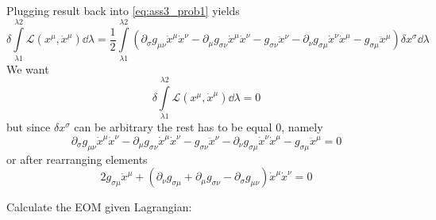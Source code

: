 %
Plugging result back into \autoref{eq:ass3_prob1} yields
%
\begin{equation}
    \delta\int\limits_{\lambda1}^{\lambda2}\mathcal{L}(x^\mu,\dot{x}^\mu)\dd\lambda =
    \frac{1}{2}\int\limits_{\lambda1}^{\lambda2}
    \left(\partial_\sigma g_{\mu\nu}\dot{x}^\mu\dot{x}^\nu -
    \partial_{\mu}g_{\sigma\nu}\dot{x}^\mu\dot{x}^\nu - g_{\sigma\nu}\ddot{x}^\nu -
    \partial_{\nu}g_{\sigma\mu}\dot{x}^\nu\dot{x}^\mu - g_{\sigma\mu}\ddot{x}^\mu\right)\delta x^\sigma \dd\lambda
\end{equation}
%
We want
%
\begin{equation}
   \delta\int\limits_{\lambda1}^{\lambda2}\mathcal{L}(x^\mu,\dot{x}^\mu)\dd\lambda = 0
\end{equation}
%
but since $\delta x^\sigma$ can be arbitrary the rest has to be equal $0$, namely
%
\begin{equation}
    \partial_\sigma g_{\mu\nu}\dot{x}^\mu\dot{x}^\nu -
    \partial_{\mu}g_{\sigma\nu}\dot{x}^\mu\dot{x}^\nu - g_{\sigma\nu}\ddot{x}^\nu -
    \partial_{\nu}g_{\sigma\mu}\dot{x}^\nu\dot{x}^\mu - g_{\sigma\mu}\ddot{x}^\mu = 0
\end{equation}
%
or after rearranging elements
%
\begin{equation}
    \boxed{2 g_{\sigma\mu}\ddot{x}^\mu + \left(\partial_{\nu}g_{\sigma\mu} +
        \partial_{\mu}g_{\sigma\nu} - \partial_\sigma g_{\mu\nu}\right)\dot{x}^\mu\dot{x}^\nu = 0}
\end{equation}

\problem

Calculate the EOM given Lagrangian:

